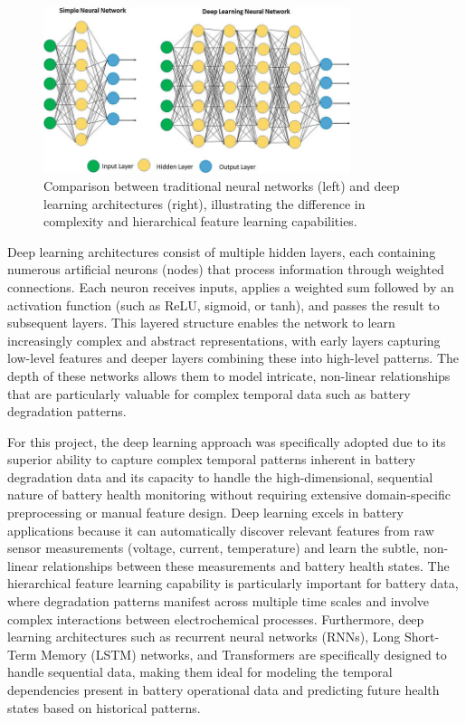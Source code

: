 \begin{figure}[htbp]
\centering
\includegraphics[width=0.8\textwidth]{imgs/neural_vs_deep.png}
\caption{Comparison between traditional neural networks (left) and deep learning architectures (right), illustrating the difference in complexity and hierarchical feature learning capabilities.}
\label{fig:neural_vs_deep}
\end{figure}

Deep learning architectures consist of multiple hidden layers, each containing numerous artificial neurons (nodes) that process information through weighted connections. Each neuron receives inputs, applies a weighted sum followed by an activation function (such as ReLU, sigmoid, or tanh), and passes the result to subsequent layers. This layered structure enables the network to learn increasingly complex and abstract representations, with early layers capturing low-level features and deeper layers combining these into high-level patterns. The depth of these networks allows them to model intricate, non-linear relationships that are particularly valuable for complex temporal data such as battery degradation patterns.

For this project, the deep learning approach was specifically adopted due to its superior ability to capture complex temporal patterns inherent in battery degradation data and its capacity to handle the high-dimensional, sequential nature of battery health monitoring without requiring extensive domain-specific preprocessing or manual feature design. Deep learning excels in battery applications because it can automatically discover relevant features from raw sensor measurements (voltage, current, temperature) and learn the subtle, non-linear relationships between these measurements and battery health states. The hierarchical feature learning capability is particularly important for battery data, where degradation patterns manifest across multiple time scales and involve complex interactions between electrochemical processes. Furthermore, deep learning architectures such as recurrent neural networks (RNNs), Long Short-Term Memory (LSTM) networks, and Transformers are specifically designed to handle sequential data, making them ideal for modeling the temporal dependencies present in battery operational data and predicting future health states based on historical patterns.



